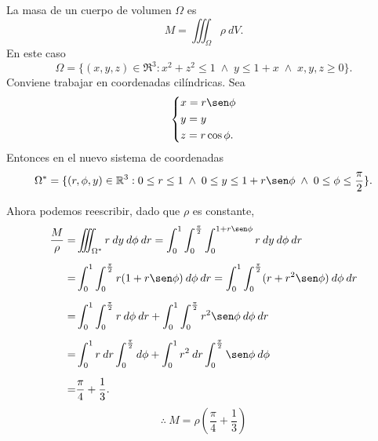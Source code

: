\begin{solution}
    La masa de un cuerpo de volumen $\Omega$ es
    \[
        M=\iiint_\Omega \rho\:dV.
    \]
    En este caso
    \[
        \Omega=\{(x,y,z)\in\Re^3:x^2+z^2\leq1\;\land\;y\leq1+x\; \land\;x,y,z\geq0\}.
    \]
    Conviene trabajar en coordenadas cil\'indricas. Sea
    \[\begin{dcases}
            x=r\sen\phi \\
            y=y         \\
            z=r\cos\phi.
        \end{dcases}\]
    Entonces en el nuevo sistema de coordenadas
    \[
        \Omega^*=\{(r,\phi,y)\in\Re^3:    0\leq  r\leq1\; \land\; 0 \leq y\leq1+r\sen\phi\;\land\;  0\leq\phi\leq\frac{\pi}{2}\}.
    \]

    Ahora podemos reescribir, dado que $\rho$ es constante,
    \begin{align*}
        \frac{M}{\rho} = & \iiint_{\Omega^*} r\:dy\:d\phi\:dr=\int_0^1 \int_0^{\frac{\pi}{2}} \int_0^{1+r\sen\phi} r\:dy\:d\phi\:dr \\[.2cm]
        =                & \int_0^1 \int_0^{\frac{\pi}{2}}r(1+r\sen\phi)\:d\phi\:dr=\int_0^1 \int_0^{\frac{\pi}{2}} ( r+r^2\sen\phi) \:d\phi\:dr \\[.2cm]
        =                & \int_0^1\int_0^{\frac{\pi}{2}} r\:d\phi\:dr+\int_0^1\int_0^{\frac{\pi}{2}}r^2\sen\phi\:d\phi\:dr                      \\[.2cm]
        =                & \int_0^1r\:dr\int_0^{\frac{\pi}{2}}d\phi+\int_0^1r^2\:dr\int_0^{\frac{\pi}{2}}\sen\phi\:d\phi                         \\[.2cm]
        =                & \frac{\pi}{4}+\frac{1}{3}.
    \end{align*}
    \[
        \therefore\:M=\rho\left(\frac{\pi}{4}+\frac{1}{3}\right)
    \]
\end{solution}


